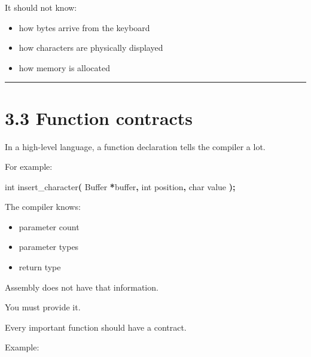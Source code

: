 \documentclass[
  oneside,
  openany]{book}
\newenvironment{Shaded}{\begin{snugshade}}{\end{snugshade}}
\newcommand{\DataTypeTok}[1]{\textcolor[rgb]{0.13,0.29,0.53}{#1}}
\newcommand{\NormalTok}[1]{#1}
\newcommand{\OperatorTok}[1]{\textcolor[rgb]{0.81,0.36,0.00}{\textbf{#1}}}
\providecommand{\tightlist}{%
  \setlength{\itemsep}{0pt}\setlength{\parskip}{0pt}}
\begin{document}
It should not know:

\begin{itemize}
\tightlist
\item
  how bytes arrive from the keyboard
\item
  how characters are physically displayed
\item
  how memory is allocated
\end{itemize}

\begin{center}\rule{0.5\linewidth}{0.5pt}\end{center}

\hypertarget{function-contracts}{%
\section{3.3 Function contracts}\label{function-contracts}}

In a high-level language, a function declaration tells the compiler a
lot.

For example:

\begin{Shaded}
\begin{Highlighting}[]
\DataTypeTok{int}\NormalTok{ insert\_character}\OperatorTok{(}
\NormalTok{    Buffer }\OperatorTok{*}\NormalTok{buffer}\OperatorTok{,}
    \DataTypeTok{int}\NormalTok{ position}\OperatorTok{,}
    \DataTypeTok{char}\NormalTok{ value}
\OperatorTok{);}
\end{Highlighting}
\end{Shaded}

The compiler knows:

\begin{itemize}
\tightlist
\item
  parameter count
\item
  parameter types
\item
  return type
\end{itemize}

Assembly does not have that information.

You must provide it.

Every important function should have a contract.

Example:
\end{document}
